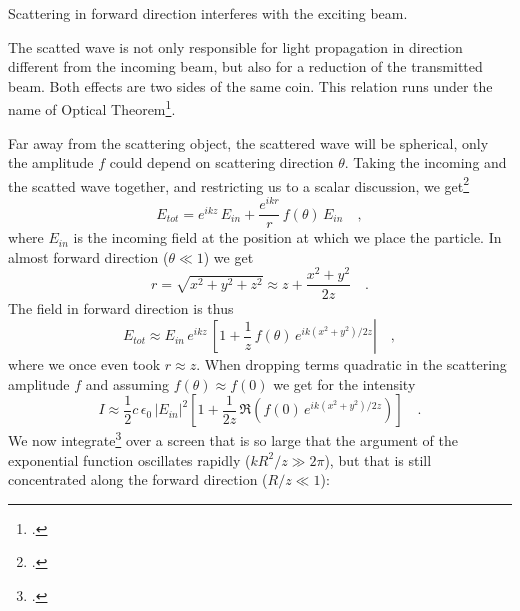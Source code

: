 \begin{marginfigure}
  \caption{Scattering in forward direction interferes with the exciting beam.}
\end{marginfigure}

The scatted wave is not only responsible for light propagation in direction different from the incoming beam, but also for a reduction of the transmitted beam. Both effects are two sides of the same coin. This relation runs under the name of Optical Theorem\footcite{Newton:1976cz}.


Far away from the scattering object, the scattered wave will be spherical, only the amplitude $f$ could depend on scattering direction $\theta$. Taking the incoming and the scatted wave together, and restricting us to a scalar discussion, we get\footcite{Newton:1976cz}
\begin{equation}
 E_{tot} =  e^{i k z}  \, E_{in}  +  \frac{e^{i k r}}{r} \, f(\theta) \,  E_{in} \quad , 
\end{equation}
where $E_{in}$ is the incoming field at the position at which we place the particle.
In almost forward direction ($\theta \ll 1$) we get
\begin{equation}
r = \sqrt{x^2 + y^2 + z^2} \approx z + \frac{x^2 + y^2}{2z } \quad .
\end{equation}
The field in forward direction is thus
\begin{equation}
 E_{tot} \approx 
 E_{in} \, e^{i k z} \, 
 \left[1 + \frac{1}{z} \, f(\theta) \, e^{i k (x^2 + y^2)/2z } \right|  \quad ,
\end{equation}
where we once even took $r \approx z$. When dropping terms quadratic in the scattering amplitude $f$ and assuming $f(\theta) \approx f(0)$ we get for the  intensity
\begin{equation}
 I  \approx \frac{1}{2} c \, \epsilon_0 \,|E_{in}|^2 \left[ 1 +   \frac{1}{2 z} \, \Re  \left( f(0) \, e^{i k (x^2 + y^2)/2z } \right) \right] \quad .
\end{equation}
We now integrate\footcite{Newton:1976cz} over a screen that is so large that the argument of the exponential function oscillates rapidly ($k R^2 / z \gg 2 \pi$), but that is still concentrated along the forward direction ($R/z \ll 1$):
